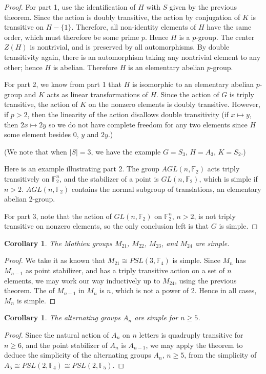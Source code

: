 \documentclass[12pt]{article}
\newtheorem{cor}[thm]{Corollary}
\newcommand{\F}{\mathbb{F}}
\begin{document}
\begin{proof}
For part 1, use the identification of $H$ with $S$ given by the previous theorem.  Since the action is doubly transitive, the  action by conjugation of $K$ is transitive on $H - \{1\}$.  Therefore, all non-identity elements of $H$ have the same order, which must therefore be some prime $p$.  Hence $H$ is a $p$-group.  The center $Z(H)$ is nontrivial, and is preserved by all automorphisms.  By double transitivity again, there is an automorphism taking any nontrivial element to any other; hence $H$ is abelian.  Therefore $H$ is an elementary abelian $p$-group.

For part 2, we know from part 1 that $H$ is isomorphic to an elementary abelian $p$-group and $K$ acts as linear transformations of $H$.  Since the action of $G$ is triply transitive, the action of $K$ on the nonzero elements is doubly transitive.  However, if $p>2$, then the linearity of the action disallows double transitivity (if $x \mapsto y$, then $2x \mapsto 2y$ so we do not have complete freedom for any two elements since $H$  some element besides 0, $y$ and $2y$.)

(We note that when $|S|=3$, we have the example $G=S_3$, $H=A_3$, $K=S_2$.)

Here is an example illustrating part 2.  The group $AGL(n,\F_2)$ acts triply transitively on $\F_2^n$, and the stabilizer of a point is $GL(n,\F_2)$, which is simple if $n>2$.  $AGL(n, \F_2)$ contains the normal subgroup of translations, an elementary abelian 2-group.

For part 3, note that the action of $GL(n,\F_2)$ on $\F_2^n$, $n>2$, is not triply transitive on nonzero elements, so the only conclusion left is that $G$ is simple.
\end{proof} 

\begin{cor}
The Mathieu groups $M_{21}$, $M_{22}$, $M_{23}$, and $M_{24}$ are simple.
\end{cor}

\begin{proof}
We take it as known that $M_{21} \cong PSL(3, \F_4)$ is simple.  Since $M_n$ has $M_{n-1}$ as point stabilizer, and has a triply transitive action on a set of $n$ elements, we may work our way inductively up to $M_{24}$, using the previous theorem.  The  of $M_{n-1}$ in $M_n$ is $n$, which is not a power of 2. Hence in all cases, $M_n$ is simple.
\end{proof}

\begin{cor}
The alternating groups $A_n$ are simple for $n \ge 5$.
\end{cor}

\begin{proof}
Since the natural action of $A_n$ on $n$ letters is quadruply transitive for $n \ge 6$, and the point stabilizer of $A_n$ is $A_{n-1}$, we may apply the theorem to deduce the simplicity of the alternating groups $A_n$, $n \ge 5$, from the simplicity of  $A_5 \cong PSL(2,\F_4) \cong PSL(2,\F_5)$.
\end{proof}

\end{document}
